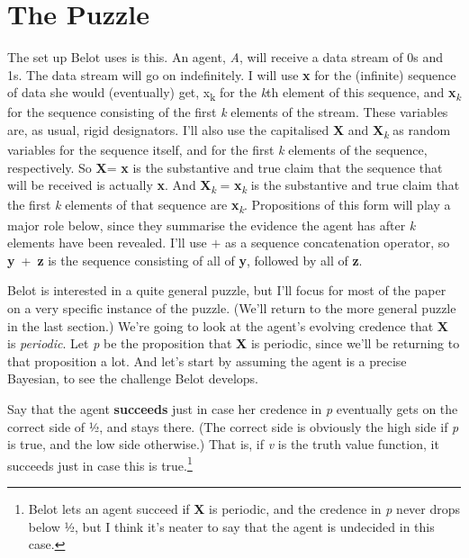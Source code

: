 \documentclass[
  10pt,
  letterpaper,
  DIV=11,
  numbers=noendperiod,
  twoside]{scrartcl}
\begin{document}
\section{The Puzzle}\label{the-puzzle}

The set up Belot uses is this. An agent, \emph{A}, will receive a data
stream of 0s and 1s. The data stream will go on indefinitely. I will use
\textbf{x} for the (infinite) sequence of data she would (eventually)
get, x\textsubscript{k} for the \emph{k}th element of this sequence, and
\textbf{x}\textsubscript{\emph{k}} for the sequence consisting of the
first \emph{k} elements of the stream. These variables are, as usual,
rigid designators. I'll also use the capitalised \textbf{X} and
\textbf{X}\textsubscript{\emph{k}} as random variables for the sequence
itself, and for the first \emph{k} elements of the sequence,
respectively. So \textbf{X}= \textbf{x} is the substantive and true
claim that the sequence that will be received is actually \textbf{x}.
And \textbf{X}\textsubscript{\emph{k}} =
\textbf{x}\textsubscript{\emph{k}} is the substantive and true claim
that the first \emph{k} elements of that sequence are
\textbf{x}\textsubscript{\emph{k}}. Propositions of this form will play
a major role below, since they summarise the evidence the agent has
after \emph{k} elements have been revealed. I'll use \(+\) as a sequence
concatenation operator, so \textbf{y}~+~\textbf{z} is the sequence
consisting of all of \textbf{y}, followed by all of \textbf{z}.

Belot is interested in a quite general puzzle, but I'll focus for most
of the paper on a very specific instance of the puzzle. (We'll return to
the more general puzzle in the last section.) We're going to look at the
agent's evolving credence that \textbf{X} is \emph{periodic}. Let
\emph{p} be the proposition that \textbf{X} is periodic, since we'll be
returning to that proposition a lot. And let's start by assuming the
agent is a precise Bayesian, to see the challenge Belot develops.

Say that the agent \textbf{succeeds} just in case her credence in
\emph{p} eventually gets on the correct side of ½, and stays there. (The
correct side is obviously the high side if \emph{p} is true, and the low
side otherwise.) That is, if \emph{v} is the truth value function, it
succeeds just in case this is true.\footnote{Belot lets an agent succeed
  if \textbf{X} is periodic, and the credence in \emph{p} never drops
  below ½, but I think it's neater to say that the agent is undecided in
  this case.}
\end{document}
